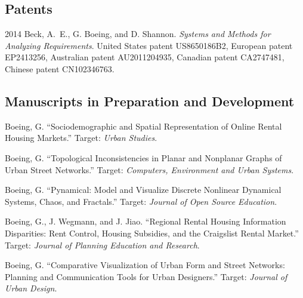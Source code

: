 \documentclass{academiccv}
\begin{document}
\subsection*{Patents}

\begin{tablist}

\item[2014] \tab Beck, A.~E., G. Boeing, and D. Shannon. \textit{Systems and Methods for Analyzing Requirements}. United States patent US8650186B2, European patent EP2413256, Australian patent AU2011204935, Canadian patent CA2747481, Chinese patent CN102346763.

\end{tablist}



\subsection*{Manuscripts in Preparation and Development}

\begin{tablist}

\item[\the\year] \tab Boeing, G. \enquote{Sociodemographic and Spatial Representation of Online Rental Housing Markets.} Target: \textit{Urban Studies}.

\item[\the\year] \tab Boeing, G. \enquote{Topological Inconsistencies in Planar and Nonplanar Graphs of Urban Street Networks.} Target: \textit{Computers, Environment and Urban Systems}.

\item[\the\year] \tab Boeing, G. \enquote{Pynamical: Model and Visualize Discrete Nonlinear Dynamical Systems, Chaos, and Fractals.} Target: \textit{Journal of Open Source Education}.

\item[\the\year] \tab Boeing, G., J. Wegmann, and J. Jiao. \enquote{Regional Rental Housing Information Disparities: Rent Control, Housing Subsidies, and the Craigslist Rental Market.} Target: \textit{Journal of Planning Education and Research}.

\item[\the\year] \tab Boeing, G. \enquote{Comparative Visualization of Urban Form and Street Networks: Planning and Communication Tools for Urban Designers.} Target: \textit{Journal of Urban Design}.
	
\end{tablist}
\end{document}
